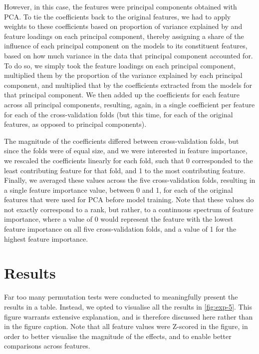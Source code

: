 However, in this case, the features were principal components obtained with PCA. To tie the coefficients back to the original features, we had to apply weights to these coefficients based on proportion of variance explained by and feature loadings on each principal component, thereby assigning a share of the influence of each principal component on the models to its constituent features, based on how much variance in the data that principal component accounted for. To do so, we simply took the feature loadings on each principal component, multiplied them by the proportion of the variance explained by each principal component, and multiplied that by the coefficients extracted from the models for that principal component. We then added up the coefficients for each feature across all principal components, resulting, again, in a single coefficient per feature for each of the cross-validation folds (but this time, for each of the original features, as opposed to principal components).

The magnitude of the coefficients differed between cross-validation folds, but since the folds were of equal size, and we were interested in feature importance, we rescaled the coefficients linearly for each fold, such that 0 corresponded to the least contributing feature for that fold, and 1 to the most contributing feature. Finally, we averaged these values across the five cross-validation folds, resulting in a single feature importance value, between 0 and 1, for each of the original features that were used for PCA before model training. Note that these values do not exactly correspond to a rank, but rather, to a continuous spectrum of feature importance, where a value of 0 would represent the feature with the lowest feature importance on all five cross-validation folds, and a value of 1 for the highest feature importance.

\section{Results}

Far too many permutation tests were conducted to meaningfully present the results in a table. Instead, we opted to visualise all the results in \autoref{fig:exp-5}. This figure warrants extensive explanation, and is therefore discussed here rather than in the figure caption. Note that all feature values were Z-scored in the figure, in order to better visualise the magnitude of the effects, and to enable better comparisons across features.

